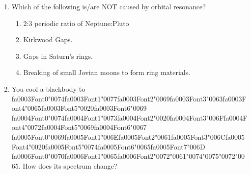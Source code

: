 \documentclass[12pt]{article}
\begin{document}
\begin{enumerate}[label=\arabic*.]
\begin{enumerate}[label=(\alph*)]
    \item plankton that use {\csname fa0011Font0\endcsname\char"0063}{\csname fa0011Font1\endcsname\char"0068}{\csname fa0011Font2\endcsname\char"0065}{\csname fa0011Font3\endcsname\char"006D}{\char"0069}{\csname fa0011Font5\endcsname\char"0063}{\csname fa0011Font6\endcsname\char"0061}{\csname fa0011Font7\endcsname\char"006C}{\csname fa0011Font8\endcsname\char"0020}{\csname fa0011Font9\endcsname\char"0072}{\csname fa0011Font10\endcsname\char"0065}{\csname fa0011Font11\endcsname\char"0061}{\csname fa0011Font12\endcsname\char"0063}{\csname fa0011Font13\endcsname\char"0074}{\csname fa0011Font14\endcsname\char"0069}{\csname fa0011Font15\endcsname\char"006F}{\csname fa0011Font16\endcsname\char"006E}{\csname fa0011Font17\endcsname\char"0073} as an energy source through photosynthesis
\end{enumerate}
\item Which of the following is/are NOT caused by orbital resonance?
\begin{enumerate}[label=(\alph*)]
    \item 2:3 periodic ratio of Neptune:Pluto
    \item Kirkwood Gaps.
    \item Gaps in Saturn's rings.
    \item Breaking of small Jovian moons to form ring materials.
\end{enumerate}
\item You cool a blackbody to {\csname fa0003Font0\endcsname\char"0074}{\csname fa0003Font1\endcsname\char"0077}{\csname fa0003Font2\endcsname\char"0069}{\csname fa0003Font3\endcsname\char"0063}{\csname fa0003Font4\endcsname\char"0065}{\csname fa0003Font5\endcsname\char"0020}{\csname fa0003Font6\endcsname\char"0069} {\csname fa0004Font0\endcsname\char"0074}{\csname fa0004Font1\endcsname\char"0073}{\csname fa0004Font2\endcsname\char"0020}{\csname fa0004Font3\endcsname\char"006F}{\csname fa0004Font4\endcsname\char"0072}{\csname fa0004Font5\endcsname\char"0069}{\csname fa0004Font6\endcsname\char"0067} {\csname fa0005Font0\endcsname\char"0069}{\csname fa0005Font1\endcsname\char"006E}{\csname fa0005Font2\endcsname\char"0061}{\csname fa0005Font3\endcsname\char"006C}{\csname fa0005Font4\endcsname\char"0020}{\csname fa0005Font5\endcsname\char"0074}{\csname fa0005Font6\endcsname\char"0065}{\csname fa0005Font7\endcsname\char"006D} {\csname fa0006Font0\endcsname\char"0070}{\csname fa0006Font1\endcsname\char"0065}{\csname fa0006Font2\endcsname\char"0072}{\char"0061}{\char"0074}{\char"0075}{\char"0072}{\char"0065}. How does its spectrum change?

\end{enumerate}
\end{document}
